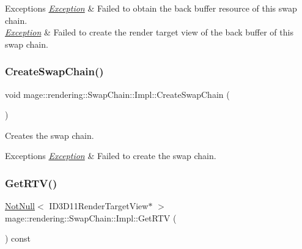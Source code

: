 \begin{DoxyExceptions}{Exceptions}
{\em \mbox{\hyperlink{classmage_1_1_exception}{Exception}}} & Failed to obtain the back buffer resource of this swap chain. \\
\hline
{\em \mbox{\hyperlink{classmage_1_1_exception}{Exception}}} & Failed to create the render target view of the back buffer of this swap chain. \\
\hline
\end{DoxyExceptions}
\mbox{\label{classmage_1_1rendering_1_1_swap_chain_1_1_impl_a990a602cf4639daa85210b4cbd1e525e}} 
\subsubsection{\texorpdfstring{Create\+Swap\+Chain()}{CreateSwapChain()}}
{\footnotesize\ttfamily void mage\+::rendering\+::\+Swap\+Chain\+::\+Impl\+::\+Create\+Swap\+Chain (\begin{DoxyParamCaption}{ }\end{DoxyParamCaption})\hspace{0.3cm}{\ttfamily [private]}}

Creates the swap chain.


\begin{DoxyExceptions}{Exceptions}
{\em \mbox{\hyperlink{classmage_1_1_exception}{Exception}}} & Failed to create the swap chain. \\
\hline
\end{DoxyExceptions}
\mbox{\label{classmage_1_1rendering_1_1_swap_chain_1_1_impl_a8c21e6075e67d434701fb63933bc114a}} 
\subsubsection{\texorpdfstring{Get\+R\+T\+V()}{GetRTV()}}
{\footnotesize\ttfamily \mbox{\hyperlink{namespacemage_a8769f9d670d6b585ea306cb1062af94b}{Not\+Null}}$<$ I\+D3\+D11\+Render\+Target\+View$\ast$ $>$ mage\+::rendering\+::\+Swap\+Chain\+::\+Impl\+::\+Get\+R\+TV (\begin{DoxyParamCaption}{ }\end{DoxyParamCaption}) const\hspace{0.3cm}{\ttfamily [noexcept]}}

